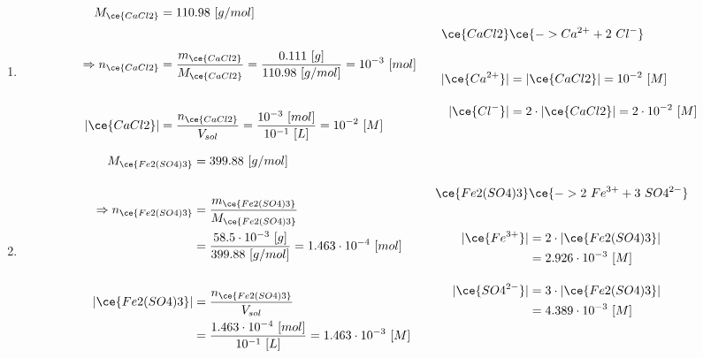 \documentclass[
  11pt,
  a4paper,
  openany]{book}
\providecommand{\tightlist}{%
  \setlength{\itemsep}{0pt}\setlength{\parskip}{0pt}}
\begin{document}
\begin{Answer}

\begin{enumerate}
\def\labelenumi{\arabic{enumi}.}
\tightlist
\item
  \[
   \begin{split}
       M_{\ce{CaCl2}} &= 110.98\ [g/mol] \\[2em]
       \Rightarrow n_{\ce{CaCl2}} &= \frac{m_{\ce{CaCl2}}}{M_{\ce{CaCl2}}} = \frac{0.111\ [g]}{110.98\ [g/mol]} = 10^{-3}\ [mol] \\[2em]
       |\ce{CaCl2}| &= \frac{n_{\ce{CaCl2}}}{V_{sol}} = \frac{10^{-3}\ [mol]}{10^{-1}\ [L]} = 10^{-2}\ [M]
   \end{split}     
   \qquad
   \begin{split}
       \ce{CaCl2} & \ce{-> Ca^{2+} + 2\ Cl^-} \\[2em]
       |\ce{Ca^{2+}}| &= |\ce{CaCl2}| = 10^{-2}\ [M] \\[1em]
       |\ce{Cl^-}| &= 2 \cdot |\ce{CaCl2}| = 2 \cdot 10^{-2}\ [M] \\
   \end{split}
  \]
\item
  \[
   \begin{split}
       M_{\ce{Fe2(SO4)3}} &= 399.88\ [g/mol] \\[2em]
       \Rightarrow n_{\ce{Fe2(SO4)3}} &= \frac{m_{\ce{Fe2(SO4)3}}}{M_{\ce{Fe2(SO4)3}}} \\
           &= \frac{58.5 \cdot 10^{-3}\ [g]}{399.88\ [g/mol]} = 1.463 \cdot 10^{-4}\ [mol] \\[2em]
       |\ce{Fe2(SO4)3}| &= \frac{n_{\ce{Fe2(SO4)3}}}{V_{sol}}\\ &= \frac{1.463 \cdot 10^{-4}\ [mol]}{10^{-1}\ [L]} = 1.463 \cdot 10^{-3}\ [M]
   \end{split}     
   \qquad
   \begin{split}
       \ce{Fe2(SO4)3} & \ce{-> 2\ Fe^{3+} + 3\ SO4^{2-}} \\[2em]
       |\ce{Fe^{3+}}| &= 2 \cdot |\ce{Fe2(SO4)3}|\\ &= 2.926 \cdot 10^{-3}\ [M] \\[1em]
       |\ce{SO4^{2-}}| &= 3 \cdot |\ce{Fe2(SO4)3}|\\ &= 4.389 \cdot 10^{-3}\ [M] \\
   \end{split}
  \]
\end{enumerate}

\end{Answer}
\end{document}
